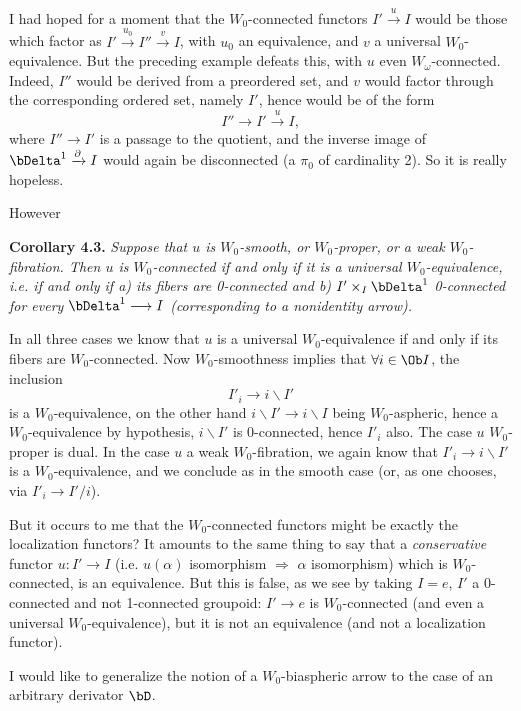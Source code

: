 I had hoped for a moment that the $W_0$-connected functors $I' \xrightarrow{u} I$ would be those which factor as $I' \xrightarrow{u_0} I'' \xrightarrow{v} I$, with $u_0$ an equivalence, and $v$ a universal $W_0$-equivalence. But the preceding example defeats this, with $u$ even $W_\omega$-connected. Indeed, $I''$ would be derived from a preordered set, and $v$ would factor through the corresponding ordered set, namely $I'$, hence would be of the form
\[
I'' \longrightarrow I' \xrightarrow{u} I,
\]
where $I'' \longrightarrow I'$ is a passage to the quotient, and the inverse image of $\bDelta^1 \xrightarrow{\partial} I$ would again be disconnected (a $\pi_0$ of cardinality 2). So it is really hopeless.

However

\textbf{Corollary 4.3.} \textit{Suppose that $u$ is $W_0$-smooth, or $W_0$-proper, or a weak $W_0$-fibration. Then $u$ is $W_0$-connected if and only if it is a universal $W_0$-equivalence, i.e. if and only if a) its fibers are \textup{0}-connected and b) $I' \times_I \bDelta^1$} \textit{\textup{0}-connected for every $\bDelta^1 \longrightarrow I$ (corresponding to a nonidentity arrow).}

In all three cases we know that $u$ is a universal $W_0$-equivalence if and only if its fibers are $W_0$-connected. Now $W_0$-smoothness implies that $\forall i \in \Ob I$, the inclusion
\[
I'_i \longrightarrow i\backslash I'
\]
is a $W_0$-equivalence, on the other hand $i\backslash I' \longrightarrow i\backslash I$ being $W_0$-aspheric, hence a $W_0$-equivalence by hypothesis, $i\backslash I'$ is 0-connected, hence $I'_i$ also. The case $u$ $W_0$-proper is dual. In the case $u$ a weak $W_0$-fibration, we again know that $I'_i \longrightarrow i\backslash I'$ is a $W_0$-equivalence, and we conclude as in the smooth case (or, as one chooses, via $I'_i \longrightarrow I'/i$).

But it occurs to me that the $W_0$-connected functors might be exactly the localization functors? It amounts to the same thing to say that a \textit{conservative} functor $u : I' \longrightarrow I$ (i.e. $u(\alpha)$ isomorphism $\Longrightarrow$ $\alpha$ isomorphism) which is $W_0$-connected, is an equivalence. But this is false, as we see by taking $I = e$, $I'$ a 0-connected and not 1-connected groupoid: $I' \longrightarrow e$ is $W_0$-connected (and even a universal $W_0$-equivalence), but it is not an equivalence (and not a localization functor).

I would like to generalize the notion of a $W_0$-biaspheric arrow to the case of an arbitrary derivator $\bD$.

